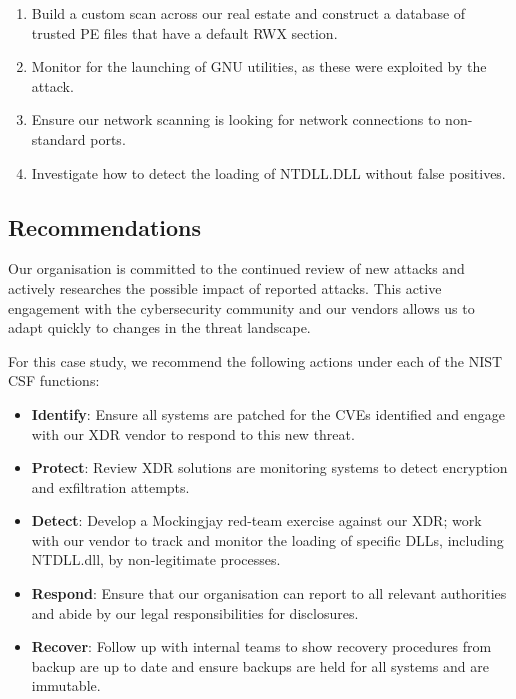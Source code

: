 \begin{enumerate}
\item Build a custom scan across our real estate and construct a database of trusted PE files that have a default RWX section.
\item Monitor for the launching of GNU utilities, as these were exploited by the attack.
\item Ensure our network scanning is looking for network connections to non-standard ports.
\item Investigate how to detect the loading of NTDLL.DLL without false positives.
\end{enumerate}


\subsection{Recommendations}

Our organisation is committed to the continued review of new attacks and actively researches the possible impact of reported attacks.
This active engagement with the cybersecurity community and our vendors allows us to adapt quickly to changes in the threat landscape.

For this case study, we recommend the following actions under each of the NIST CSF functions:

\begin{itemize}
\item \textbf{Identify}: Ensure all systems are patched for the CVEs identified and engage with our XDR vendor to respond to this new threat.
\item \textbf{Protect}: Review XDR solutions are monitoring systems to detect encryption and exfiltration attempts.
\item \textbf{Detect}: Develop a Mockingjay red-team exercise against our XDR; work with our vendor to track and monitor the loading of specific
  DLLs, including NTDLL.dll, by non-legitimate processes.
\item \textbf{Respond}: Ensure that our organisation can report to all relevant authorities and abide by our legal
  responsibilities for disclosures.
\item \textbf{Recover}: Follow up with internal teams to show recovery procedures from backup are up to date and ensure backups are held for all systems and are immutable. 
\end{itemize}

